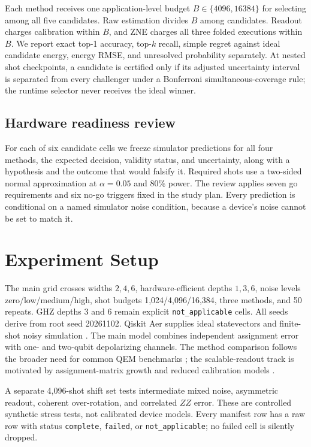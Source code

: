 \documentclass[10pt,twocolumn]{article}
\begin{document}
Each method receives one application-level budget $B\in\{4096,16384\}$ for selecting
among all five candidates. Raw estimation divides $B$ among candidates. Readout
charges calibration within $B$, and ZNE charges all three folded executions within
$B$. We report exact top-1 accuracy, top-$k$ recall, simple regret against ideal
candidate energy, energy RMSE, and unresolved probability separately. At nested
shot checkpoints, a candidate is certified only if its adjusted uncertainty interval
is separated from every challenger under a Bonferroni simultaneous-coverage rule;
the runtime selector never receives the ideal winner.

\subsection{Hardware readiness review}
For each of six candidate cells we freeze simulator predictions for all four methods, the
expected decision, validity status, and uncertainty, along with a hypothesis and the outcome
that would falsify it. Required shots use a two-sided normal approximation at
$\alpha=0.05$ and 80\% power. The review applies seven go requirements and six no-go triggers
fixed in the study plan. Every prediction is conditional on a named simulator noise condition,
because a device's noise cannot be set to match it.

\section{Experiment Setup}
The main grid crosses widths $2,4,6$, hardware-efficient depths $1,3,6$, noise levels
zero/low/medium/high, shot budgets 1,024/4,096/16,384, three methods, and 50 repeats.
GHZ depths 3 and 6 remain explicit \texttt{not\_applicable} cells. All seeds derive
from root seed 20261102. Qiskit Aer supplies ideal statevectors and finite-shot noisy
simulation \cite{qiskitaer}. The main model combines independent assignment error
with one- and two-qubit depolarizing channels.
The method comparison follows the broader need for common QEM benchmarks
\cite{bultrini2021}; the scalable-readout track is motivated by assignment-matrix
growth and reduced calibration models \cite{nation2021}.

A separate 4,096-shot shift set tests intermediate mixed noise, asymmetric readout,
coherent over-rotation, and correlated $ZZ$ error. These are controlled synthetic
stress tests, not calibrated device models. Every manifest row has a raw row with
status \texttt{complete}, \texttt{failed}, or \texttt{not\_applicable}; no failed
cell is silently dropped.
\end{document}
